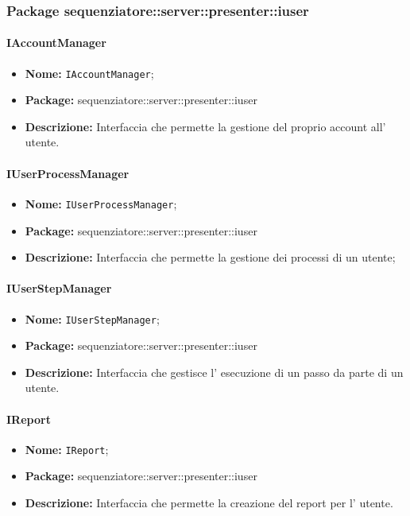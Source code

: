\subsubsection{Package sequenziatore::server::presenter::iuser}
\paragraph{IAccountManager}
	\begin{itemize}
		\item \textbf{Nome:} \texttt{IAccountManager};
		\item \textbf{Package:} sequenziatore::server::presenter::iuser
		\item \textbf{Descrizione:} Interfaccia che permette la gestione del proprio account all' utente.
	\end{itemize}
\paragraph{IUserProcessManager}
	\begin{itemize}
		\item \textbf{Nome:} \texttt{IUserProcessManager};
		\item \textbf{Package:} sequenziatore::server::presenter::iuser
		\item \textbf{Descrizione:} Interfaccia che permette la gestione dei processi di un utente;
	\end{itemize}
\paragraph{IUserStepManager}
	\begin{itemize}
		\item \textbf{Nome:} \texttt{IUserStepManager};
		\item \textbf{Package:} sequenziatore::server::presenter::iuser
		\item \textbf{Descrizione:} Interfaccia che gestisce l' esecuzione di un passo da parte di un utente.
	\end{itemize}
\paragraph{IReport}
	\begin{itemize}
		\item \textbf{Nome:} \texttt{IReport};
		\item \textbf{Package:} sequenziatore::server::presenter::iuser
		\item \textbf{Descrizione:} Interfaccia che permette la creazione del report per l' utente.
	\end{itemize}

